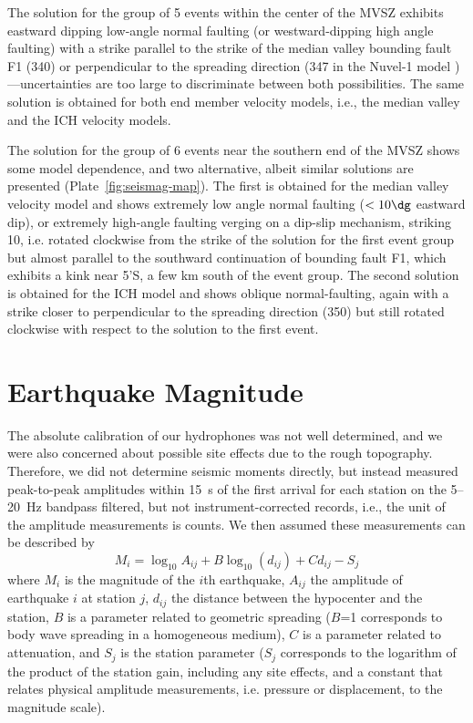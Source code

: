\documentclass[aguplus]{aguplus}
\newlength{\tw}
\begin{document}
\begin{article}
The solution for the group of 5 events within the center of the
MVSZ exhibits eastward dipping low-angle normal
faulting (or westward-dipping high angle faulting)
with a strike parallel to the strike of the median valley bounding
fault F1 (340\dg) or perpendicular to the spreading direction (347{\dg} in
the Nuvel-1 model \citep{demets90})---uncertainties are too large to
discriminate between both possibilities.
The same solution is obtained for both end member velocity models,
i.e., the median valley and the ICH velocity models.

The solution for the group of 6 events near the southern end of
the MVSZ shows some model dependence, and two alternative, albeit similar
solutions are presented (Plate~\ref{fig:seismag-map}).  The first is obtained for the median valley
velocity model and shows extremely low angle normal faulting ($<10\dg$
eastward dip), or extremely high-angle faulting verging on a dip-slip
mechanism, striking 10\dg, i.e. rotated clockwise from the strike of
the solution for the first event group but almost parallel to the southward continuation
of bounding fault F1, which exhibits a kink near 5'S,  a few km south of the
event group.  The second solution is obtained for the ICH model and
shows oblique normal-faulting, again with a strike closer to
perpendicular to the spreading direction (350\dg) but still rotated
clockwise with respect to the  solution to the first event.

\section{Earthquake Magnitude}

The absolute calibration of our hydrophones was not well determined,
and we were also concerned about possible site effects due to
the rough topography.  Therefore, we did not determine seismic moments
directly, but instead measured peak-to-peak amplitudes within 15~s of
the first arrival for each station on the 5--20~Hz bandpass filtered,
but not instrument-corrected
records, i.e., the unit of the amplitude measurements is counts.
  We then assumed these measurements
can be described by \citep[modified from][]{hutton87}
\begin{equation}
M_i=\log_{10} A_{ij} + B \log_{10}(d_{ij}) + C d_{ij} - S_{j}
\end{equation}
where $M_i$ is the magnitude of the $i$th earthquake, $A_{ij}$ the
amplitude of earthquake $i$ at station $j$, $d_{ij}$ the distance
between the hypocenter and the station, $B$ is a parameter related to
geometric spreading ($B$=1 corresponds to body wave spreading in a
homogeneous medium), $C$ is a parameter related to attenuation, and
$S_{j}$ is the station parameter ($S_{j}$ corresponds to the logarithm
of the product of the station gain, including any site effects, and a
constant that relates physical amplitude measurements, i.e. pressure
or displacement, to the magnitude scale).


\end{article}
\end{document}
